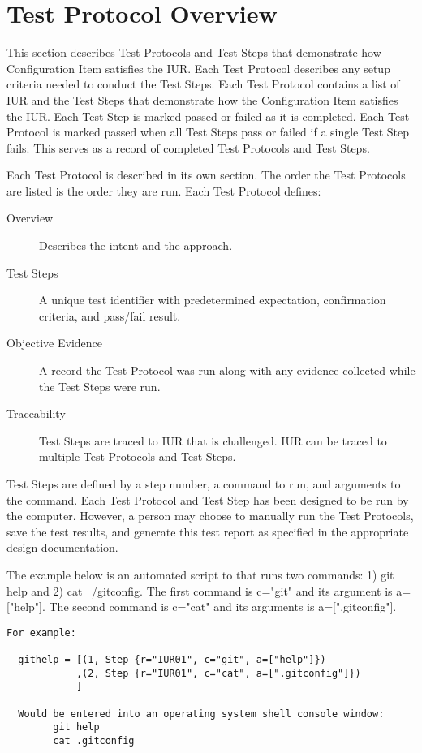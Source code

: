 \newpage
\section{Test Protocol Overview}
This section describes Test Protocols and Test Steps that demonstrate how
Configuration Item satisfies the IUR.  Each Test Protocol describes any setup
criteria needed to conduct the Test Steps. Each Test Protocol contains a list of
IUR and the Test Steps that demonstrate how the Configuration Item satisfies the
IUR. Each Test Step is marked passed or failed as it is completed.  Each Test
Protocol is marked passed when all Test Steps pass or failed if a single Test
Step fails.  This serves as a record of completed Test Protocols and Test Steps.

Each Test Protocol is described in its own section.  The order the Test
Protocols are listed is the order they are run.  Each Test Protocol defines:
\begin{description}

\item[Overview] \quad
Describes the intent and the approach.

\item[Test Steps] \quad
A unique test identifier with predetermined expectation,
confirmation criteria, and pass/fail result.

\item[Objective Evidence] \quad
A record the Test Protocol was run along with any evidence collected while
the Test Steps were run.

\item[Traceability] \quad
Test Steps are traced to IUR that is challenged. IUR can be traced to
multiple Test Protocols and Test Steps.

\end{description}

Test Steps are defined by a step number, a command to run, and arguments to the
command.  Each Test Protocol and Test Step has been designed to be run by the
computer. However, a person may choose to manually run the Test Protocols, save
the test results, and generate this test report as specified in the appropriate
design documentation.

The example below is an automated script to that runs two commands: 1) git help
and 2) cat ~/gitconfig.  The first command is c="git" and its argument is
a=["help"].  The second command is c="cat" and its arguments is
a=[".gitconfig"].

\begin{verbatim}
For example:

  githelp = [(1, Step {r="IUR01", c="git", a=["help"]})
            ,(2, Step {r="IUR01", c="cat", a=[".gitconfig"]})
            ]

  Would be entered into an operating system shell console window:
        git help
        cat .gitconfig
\end{verbatim}

